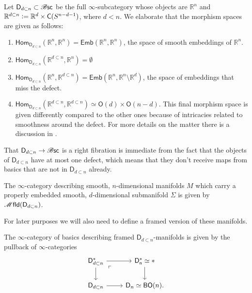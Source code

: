 \documentclass[../text]{subfiles}
\begin{document}
\begin{construction}
    Let $\mathsf{D}_{d \subset n} \subset \mathscr{B} \mathsf{sc}$ be the full $\infty$-subcategory whose objects are $\mathbb{R}^n$ and $\mathbb{R}^{d \subset n} := \mathbb{R}^{d} \times \cone(S^{n-d-1})$, where $d < n$. We elaborate that the morphism spaces are given as follows:
    \begin{enumerate}
        \item $\mathsf{Hom}_{\mathsf{D}_{d \subset n}} (\mathbb{R}^n, \mathbb{R}^n) = \mathsf{Emb}(\mathbb{R}^n, \mathbb{R}^n)$, the space of smooth embeddings of $\mathbb{R}^n$.
        \item $\mathsf{Hom}_{\mathsf{D}_{d \subset n}} (\mathbb{R}^{d \subset n}, \mathbb{R}^n) = \emptyset$
        \item $\mathsf{Hom}_{\mathsf{D}_{d \subset n}} (\mathbb{R}^n, \mathbb{R}^{d \subset n}) = \mathsf{Emb}(\mathbb{R}^n, \mathbb{R}^n \setminus \mathbb{R}^d)$, the space of embeddings that miss the defect.
        \item $\mathsf{Hom}_{\mathsf{D}_{d \subset n}} (\mathbb{R}^{d \subset n}, \mathbb{R}^{d \subset n}) \simeq \mathsf{O}(d) \times \mathsf{O}(n-d)$. This final morphism space is given differently compared to the other ones because of intricacies related to smoothness around the defect. For more details on the matter there is a discussion in \cite[Example 5.1.7]{aft_localstrut}.
    \end{enumerate}
    That $\mathsf{D}_{d \subset n} \rightarrow \mathscr{B} \mathsf{sc}$ is a right fibration is immediate from the fact that the objects of $\mathsf{D}_{d \subset n}$ have at most one defect, which means that they don't receive maps from basics that are not in $\mathsf{D}_{d \subset n}$ already.
\end{construction}

\begin{definition}\label{def:mfld_disk_dn}
    The $\infty$-category describing smooth, $n$-dimensional manifolds $M$ which carry a properly embedded smooth, $d$-dimensional submanifold $\Sigma$ is given by $\mfld(\mathsf{D}_{d \subset n})$.
\end{definition}

For later purposes we will also need to define a framed version of these manifolds.

\begin{definition}\label{def:framed_d_under_n_structure}
    The $\infty$-category of basics describing framed $\mathsf{D}_{d \subset n}$-manifolds is given by the pullback of $\infty$-categories
    \begin{equation}
        \begin{tikzcd}
            \mathsf{D}_{d \subset n}^* \arrow[dr, phantom, "\ulcorner", very near start] \arrow[r] \arrow[d] & \mathsf{D_n^*} \simeq * \arrow[d] \\
            \mathsf{D}_{d \subset n} \arrow[r] & \mathsf{D}_n \simeq \mathsf{BO}(n).
        \end{tikzcd}
    \end{equation}
\end{definition}
\end{document}
